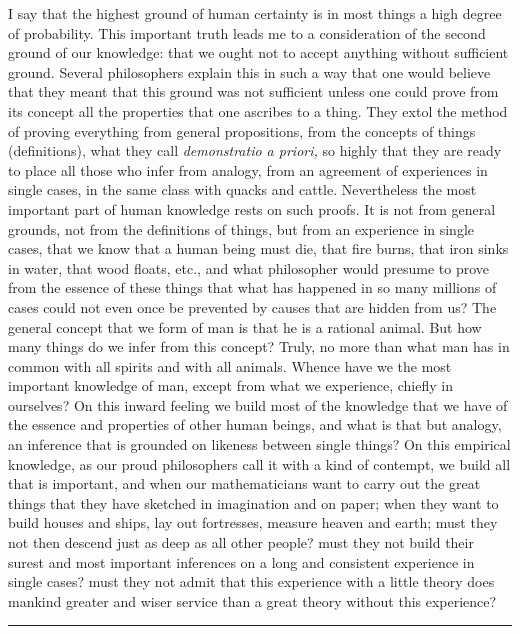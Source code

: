 \documentclass[12pt,a4paper,openany]{book}
\newcommand{\opage}[1]{\marginnote{\footnotesize\textit{[#1]}}}
\newcommand{\sectionrule}{\par\begin{center}\rule{4em}{0.4pt}\end{center}}
\begin{document}
I say that the highest ground of human certainty is in most things a high degree
of probability. This important truth leads me to a consideration of the second
ground of our knowledge: that we ought not to accept anything without sufficient
ground. Several philosophers explain this in such a way that one would believe
that they meant that this ground was not sufficient unless one could prove from
its concept all the properties that one ascribes to a thing. They extol the
method of proving everything from general propositions, from the concepts of
things (definitions), what they call \textit{demonstratio a
priori,} so highly that they are ready to place all those who
infer from analogy, from an agreement of experiences in single cases, in the same
class with quacks and cattle. Nevertheless the most important part of human
knowledge rests on such proofs. It is not from general grounds, not from the
definitions of things, but from an experience in single
\setcounter{footnote}{0}%
\opage{35}cases, that we know that a human being must die, that fire burns, that iron
sinks in water, that wood floats, etc., and what philosopher would presume to
prove from the essence of these things that what has happened in so many millions
of cases could not even once be prevented by causes that are hidden from us? The
general concept that we form of man is that he is a rational animal. But how many
things do we infer from this concept? Truly, no more than what man has in common
with all spirits and with all animals. Whence have we the most important
knowledge of man, except from what we experience, chiefly in ourselves? On this
inward feeling we build most of the knowledge that we have of the essence and
properties of other human beings, and what is that but analogy, an inference that
is grounded on likeness between single things? On this empirical knowledge, as
our proud philosophers call it with a kind of contempt, we build all that is
important, and when our mathematicians want to carry out the great things that
they have sketched in imagination and on paper; when they want to build houses
and ships, lay out fortresses, measure heaven and earth; must they not then
descend just as deep as all other people? must they not build their surest and
most important inferences on a long and consistent experience in single cases?
must they not admit that this experience with a little theory does mankind greater
and wiser service than a great theory without this experience?

\sectionrule
\end{document}
